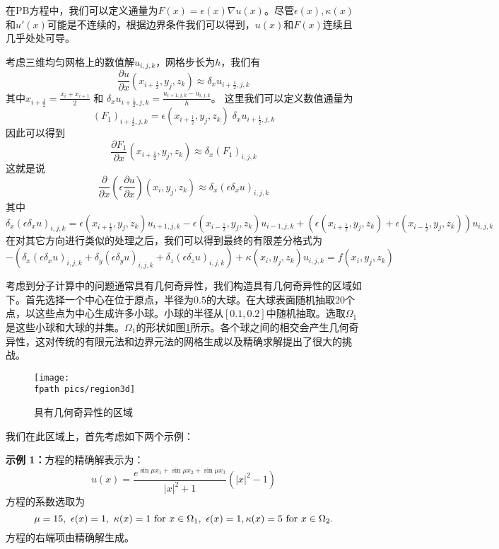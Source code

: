 在PB方程中，我们可以定义通量为$F(x) = \epsilon(x) \nabla u(x)$。尽管$\epsilon(x), \kappa(x)$和$u'(x)$可能是不连续的，根据边界条件我们可以得到，$u(x)$和$F(x)$连续且几乎处处可导。

考虑三维均匀网格上的数值解$u_{i,j,k}$，网格步长为$h$，我们有
$$ \frac{\partial u}{\partial x}(x_{i+\frac12}, y_{j}, z_{k}) \approx \delta_{x} u_{i+\frac12, j, k} $$
其中$x_{i+\frac12} = \frac{x_{i} + x_{i+1}}{2}$ 和 $\delta_{x} u_{i+\frac12, j, k} = \frac{u_{i+1, j, k} - u_{i, j, k}}{h}$。
这里我们可以定义数值通量为
$$ (F_1)_{i+\frac12, j, k} = \epsilon(x_{i+\frac12}, y_{j}, z_{k}) \; \delta_{x} u_{i+\frac12, j, k} $$
因此可以得到
$$ \frac{\partial F_1}{\partial x}(x_{i+\frac12}, y_{j}, z_{k}) \approx \delta_{x} (F_1)_{i, j, k} $$
这就是说
$$ \frac{\partial}{\partial x}(\epsilon \frac{\partial u}{\partial x}) (x_{i}, y_{j}, z_{k}) \approx \delta_{x} (\epsilon \delta_{x} u)_{i,j,k} $$
其中
$$ \delta_{x} (\epsilon \delta_{x} u)_{i,j,k} = \epsilon(x_{i+\frac12}, y_{j}, z_{k}) u_{i+1, j, k} - \epsilon(x_{i-\frac12}, y_{j}, z_{k}) u_{i-1, j, k} + (\epsilon(x_{i+\frac12}, y_{j}, z_{k}) + \epsilon(x_{i-\frac12}, y_{j}, z_{k})) u_{i, j, k} $$
在对其它方向进行类似的处理之后，我们可以得到最终的有限差分格式为
$$ -(\delta_{x} (\epsilon \delta_{x} u)_{i,j,k} + \delta_{y} (\epsilon \delta_{y} u)_{i,j,k} + \delta_{z} (\epsilon \delta_{z} u)_{i,j,k}) + \kappa(x_{i}, y_{j}, z_{k}) u_{i,j,k} = f(x_{i}, y_{j}, z_{k}) $$



考虑到分子计算中的问题通常具有几何奇异性，我们构造具有几何奇异性的区域如下。首先选择一个中心在位于原点，半径为$0.5$的大球。在大球表面随机抽取20个点，以这些点为中心生成许多小球。小球的半径从$[0.1, 0.2]$中随机抽取。选取$\Omega_1$是这些小球和大球的并集。$\Omega_1$的形状如图\ref{region}所示。各个球之间的相交会产生几何奇异性，这对传统的有限元法和边界元法的网格生成以及精确求解提出了很大的挑战。

\begin{figure}[htbp]
\centering
\texttt{[image: \\fpath pics/region3d]}
\caption{具有几何奇异性的区域}
\label{region}
\end{figure}

我们在此区域上，首先考虑如下两个示例：

\textbf{示例 1：}方程的精确解表示为：
\begin{equation}
u(x) = \frac{e^{\sin \mu x_1 + \sin \mu x_2 + \sin \mu x_3}}{|x|^2 + 1} (|x|^2 - 1)
\end{equation}
方程的系数选取为
\begin{equation}
\mu = 15, \ \epsilon(x) = 1, \ \kappa(x) = 1 \ {\rm for}\ x\in\Omega_1, \ \epsilon(x) = 1, \kappa(x) = 5 \ {\rm for}\ x\in\Omega_2.
\end{equation}
方程的右端项由精确解生成。

